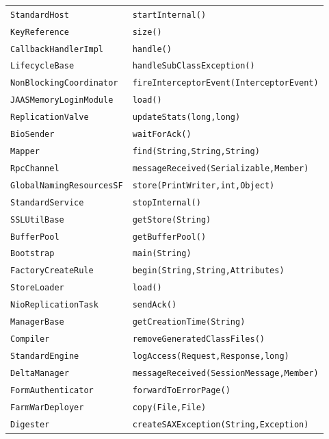 \begin{center}
\begin{longtable}{ll}
 \lstinline/StandardHost/&{\lstinline/startInternal()/}\\
 \lstinline/KeyReference/&{\lstinline/size()/}\\
 \lstinline/CallbackHandlerImpl/&{\lstinline/handle()/}\\
 \lstinline/LifecycleBase/&{\lstinline/handleSubClassException()/}\\
 \lstinline/NonBlockingCoordinator/&{\lstinline/fireInterceptorEvent(InterceptorEvent)/}\\
 \lstinline/JAASMemoryLoginModule/&{\lstinline/load()/}\\
 \lstinline/ReplicationValve/&{\lstinline/updateStats(long,long)/}\\
 \lstinline/BioSender/&{\lstinline/waitForAck()/}\\
 \lstinline/Mapper/&{\lstinline/find(String,String,String)/}\\
 \lstinline/RpcChannel/&{\lstinline/messageReceived(Serializable,Member)/}\\
 \lstinline/GlobalNamingResourcesSF/&{\lstinline/store(PrintWriter,int,Object)/}\\
 \lstinline/StandardService/&{\lstinline/stopInternal()/}\\
 \lstinline/SSLUtilBase/&{\lstinline/getStore(String)/}\\
 \lstinline/BufferPool/&{\lstinline/getBufferPool()/}\\
 \lstinline/Bootstrap/&{\lstinline/main(String)/}\\
 \lstinline/FactoryCreateRule/&{\lstinline/begin(String,String,Attributes)/}\\
 \lstinline/StoreLoader/&{\lstinline/load()/}\\
  \lstinline/NioReplicationTask/&{\lstinline/sendAck()/}\\
 \lstinline/ManagerBase/&{\lstinline/getCreationTime(String)/}\\
 \lstinline/Compiler/&{\lstinline/removeGeneratedClassFiles()/}\\
 \lstinline/StandardEngine/&{\lstinline/logAccess(Request,Response,long)/}\\
 \lstinline/DeltaManager/&{\lstinline/messageReceived(SessionMessage,Member)/}\\
 \lstinline/FormAuthenticator/&{\lstinline/forwardToErrorPage()/}\\
 \lstinline/FarmWarDeployer/&{\lstinline/copy(File,File)/}\\
 \lstinline/Digester/&{\lstinline/createSAXException(String,Exception)/}\\

\end{longtable}
\end{center}
